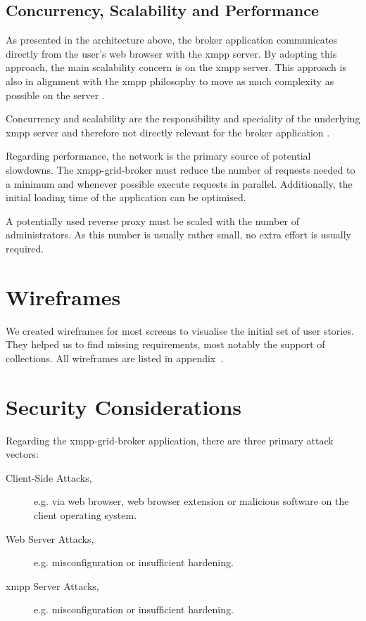 \subsection{Concurrency, Scalability and Performance}

As presented in the architecture above, the \gls{broker} application communicates directly from the user's web browser with the \gls{xmpp} server.
By adopting this approach, the main scalability concern is on the \gls{xmpp} server.
This approach is also in alignment with the \gls{xmpp} philosophy to move as much complexity as possible on the server \cite{definitive-guide-xmpp}.

Concurrency and scalability are the responsibility and speciality of the underlying \gls{xmpp} server and therefore not directly relevant for the \gls{broker} application \cite{definitive-guide-xmpp}.

Regarding performance, the network is the primary source of potential slowdowns.
The \gls{xmpp-grid-broker} must reduce the number of requests needed to a minimum and whenever possible execute requests in parallel.
Additionally, the initial loading time of the application can be optimised.

A potentially used reverse proxy must be scaled with the number of administrators.
As this number is usually rather small, no extra effort is usually required.

\section{Wireframes}

We created wireframes for most screens to visualise the initial set of user stories.
They helped us to find missing requirements, most notably the support of collections.
All wireframes are listed in appendix~.

\section{Security Considerations}\label{sec:security-considerations}

Regarding the \gls{xmpp-grid-broker} application, there are three primary attack vectors:

\begin{description}
    \item[Client-Side Attacks,] e.g. via web browser, web browser extension or malicious software on the client operating system.
    \item[Web Server Attacks,] e.g. misconfiguration or insufficient hardening.
    \item[\gls{xmpp} Server Attacks,] e.g. misconfiguration or insufficient hardening.
\end{description}

